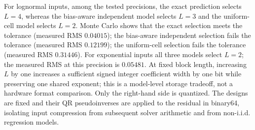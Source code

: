 For lognormal inputs, among the tested precisions, the exact prediction
selects $L=4$, whereas the bias-aware independent model selects
$L=3$ and the uniform-cell model selects $L=2$.
Monte Carlo shows that the exact selection meets the tolerance (measured RMS $0.04015$); the bias-aware independent selection fails the tolerance (measured RMS $0.12199$); the uniform-cell selection fails the tolerance (measured RMS $0.31446$). For exponential inputs all three models select
$L=2$; the measured RMS at this precision is $0.05481$.
At fixed block length, increasing
$L$ by one increases a sufficient signed integer coefficient width by
one bit while preserving one shared exponent; this is a model-level
storage tradeoff, not a hardware format comparison. Only the right-hand
side is quantized. The designs are fixed and their QR pseudoinverses are
applied to the residual in binary64, isolating input compression from
subsequent solver arithmetic and from non-i.i.d. regression models.
